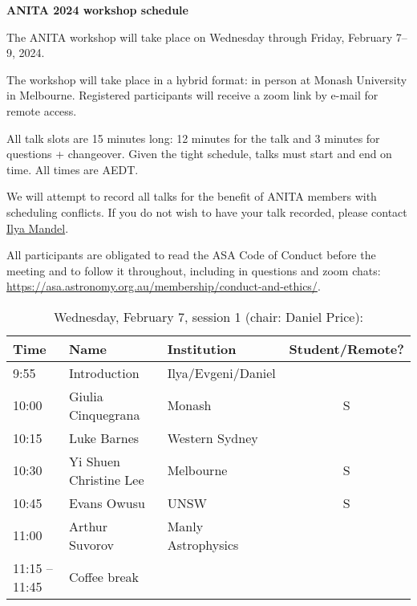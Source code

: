 \documentclass[amsmath,onecolumn]{revtex4-1}
\begin{document}
\begin{center}
{\bf ANITA 2024 workshop schedule}\\
\end{center}
\vspace{0.2in}

The ANITA workshop will take place on Wednesday through Friday, February 7--9, 2024.

The workshop will take place in a hybrid format: in person at Monash University in Melbourne.  Registered participants will receive a zoom link by e-mail for remote access.  


All talk slots are 15 minutes long: 12 minutes for the talk and 3 minutes for questions + changeover.  Given the tight schedule, talks must start and end on time.  All times are AEDT.


We will attempt to record all talks for the benefit of ANITA members with scheduling conflicts.  If you do not wish to have your talk recorded, please contact \href{mailto:ilya.mandel@monash.edu}{Ilya Mandel}.

All participants are obligated to read the ASA Code of Conduct before the meeting and to follow it throughout, including in questions and zoom chats:
\url{https://asa.astronomy.org.au/membership/conduct-and-ethics/}.


\FloatBarrier

\begin{table}[!htbp]
	\centering
	\caption{Wednesday, February 7, session 1 (chair: Daniel Price):}
\begin{tabular}{| l | l | l | c |}
	\hline
	Time & Name  & Institution & Student/Remote? \\ 		
	\hline
	9:55 & Introduction & Ilya/Evgeni/Daniel & \\
	\hline
	10:00 & Giulia	Cinquegrana & Monash & S\\
	10:15 & 	Luke	Barnes & Western Sydney & \\
	10:30 & Yi Shuen Christine	Lee & Melbourne&  S\\
	10:45 & Evans	Owusu & UNSW & S \\
	11:00 & Arthur	Suvorov & Manly Astrophysics & \\
	\hline
	11:15 -- 11:45 & Coffee break & & \\
	\hline
\end{tabular}
\end{table}
\end{document}
